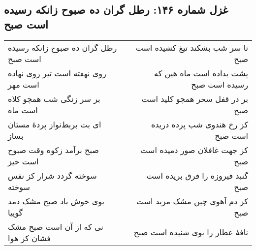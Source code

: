 \begin{center}
\section*{غزل شماره ۱۴۶: رطل گران ده صبوح زانکه رسیده است صبح}
\label{sec:146}
\begin{longtable}{l p{0.5cm} r}
رطل گران ده صبوح زانکه رسیده است صبح
&&
تا سر شب بشکند تیغ کشیده است صبح
\\
روی نهفته است تیر روی نهاده است مهر
&&
پشت بداده است ماه هین که رسیده است صبح
\\
بر سر زنگی شب همچو کلاه است ماه
&&
بر در قفل سحر همچو کلید است صبح
\\
ای بت بربط‌نواز پردهٔ مستان بساز
&&
کز رخ هندوی شب پرده دریده است صبح
\\
صبح برآمد زکوه وقت صبوح است خیز
&&
کز جهت غافلان صور دمیده است صبح
\\
سوخته گردد شرار کز نفس سوخته
&&
گنبد فیروزه را فرق بریده است صبح
\\
بوی خوش باد صبح مشک دمد گوییا
&&
کز دم آهوی چین مشک مزید است صبح
\\
نی که از آن است صبح مشک فشان کز هوا
&&
نافهٔ عطار را بوی شنیده است صبح
\\
\end{longtable}
\end{center}
